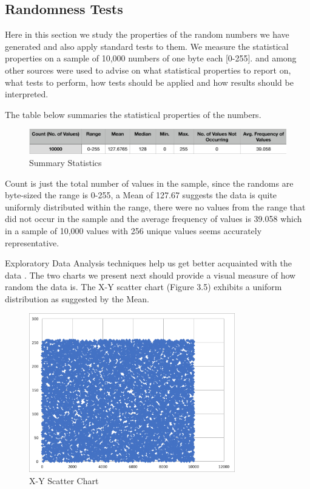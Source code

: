 \documentclass{bhamthesis}
\begin{document}
\subsection{Randomness Tests}
Here in this section we study the properties of the random numbers we have generated and also apply standard tests to them. We measure the statistical properties on a sample of 10,000 numbers of one byte each [0-255]. \cite{randeval} and \cite{foley} among other sources were used to advise on what statistical properties to report on, what tests to perform, how tests should be applied and how results should be interpreted.\par
The table below summaries the statistical properties of the numbers. \par
\begin{figure}[ht]
\caption{Summary Statistics}
\centering
\includegraphics[width=1\textwidth]{stat_summary.png}
\end{figure}
Count is just the total number of values in the sample, since the randoms are byte-sized the range is 0-255, a Mean of 127.67 suggests the data is quite uniformly distributed within the range, there were no values from the range that did not occur in the sample and the average frequency of values is 39.058 which in a sample of 10,000 values with 256 unique values seems accurately representative.\par
Exploratory Data Analysis techniques help us get better acquainted with the data \cite{foley}. The two charts we present next should provide a visual measure of how random the data is. The X-Y scatter chart (Figure 3.5) exhibits a uniform distribution as suggested by the Mean.
\begin{figure}[ht]
\caption{X-Y Scatter Chart}
\centering
\includegraphics[width=0.8\textwidth]{xyscatter.png}
\end{figure}
\end{document}
